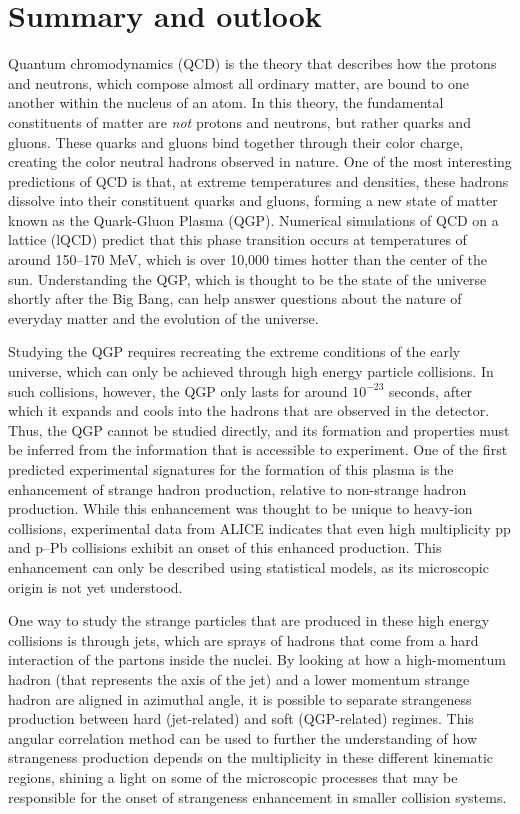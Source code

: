 \chapter{Summary and outlook}

Quantum chromodynamics (QCD) is the theory that describes how the protons and neutrons, which compose almost all ordinary matter, are bound to one another within the nucleus of an atom. In this theory, the fundamental constituents of matter are \textit{not} protons and neutrons, but rather quarks and gluons. These quarks and gluons bind together through their color charge, creating the color neutral hadrons observed in nature. One of the most interesting predictions of QCD is that, at extreme temperatures and densities, these hadrons dissolve into their constituent quarks and gluons, forming a new state of matter known as the Quark-Gluon Plasma (QGP). Numerical simulations of QCD on a lattice (lQCD) predict that this phase transition occurs at temperatures of around 150--170 MeV, which is over 10,000 times hotter than the center of the sun. Understanding the QGP, which is thought to be the state of the universe shortly after the Big Bang, can help answer questions about the nature of everyday matter and the evolution of the universe.

Studying the QGP requires recreating the extreme conditions of the early universe, which can only be achieved through high energy particle collisions. In such collisions, however, the QGP only lasts for around $10^{-23}$ seconds, after which it expands and cools into the hadrons that are observed in the detector. Thus, the QGP cannot be studied directly, and its formation and properties must be inferred from the information that is accessible to experiment. One of the first predicted experimental signatures for the formation of this plasma is the enhancement of strange hadron production, relative to non-strange hadron production. While this enhancement was thought to be unique to heavy-ion collisions, experimental data from ALICE indicates that even high multiplicity pp and p--Pb collisions exhibit an onset of this enhanced production. This enhancement can only be described using statistical models, as its microscopic origin is not yet understood.

One way to study the strange particles that are produced in these high energy collisions is through jets, which are sprays of hadrons that come from a hard interaction of the partons inside the nuclei. By looking at how a high-momentum hadron (that represents the axis of the jet) and a lower momentum strange hadron are aligned in azimuthal angle, it is possible to separate strangeness production between hard (jet-related) and soft (QGP-related) regimes. This angular correlation method can be used to further the understanding of how strangeness production depends on the multiplicity in these different kinematic regions, shining a light on some of the microscopic processes that may be responsible for the onset of strangeness enhancement in smaller collision systems.

